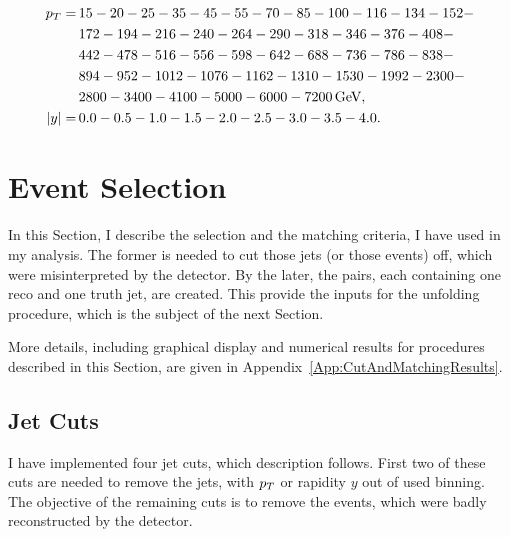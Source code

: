 \begin{align}
  p_{T} = \, &15-20-25-35-45-55-70-85-100-116-134-152- \nonumber \\
        &172-194-216-240-264-290-318-346-376-408- \nonumber \\
        &442-478-516-556-598-642-688-736-786-838- \nonumber \\
        &894-952-1012-1076-1162-1310-1530-1992-2300- \nonumber \\
        &2800-3400-4100-5000-6000-7200 \,\text{GeV}, \nonumber \\
  |y| = \, &0.0-0.5-1.0-1.5-2.0-2.5-3.0-3.5-4.0.
  \label{eq:Binning}
\end{align}

\section{Event Selection}

In this Section, I describe the selection and the matching criteria, I have used
in my analysis. The former is needed to cut those jets (or those events) off,
which were misinterpreted by the detector. By the later, the pairs, each
containing one reco and one truth jet, are created. This provide
the inputs for the unfolding procedure, which is the subject of the next
Section.

More details, including graphical display and numerical results for procedures
described in this Section, are given in Appendix~\ref{App:CutAndMatchingResults}.

\subsection{Jet Cuts}
\label{SubSec:JetCuts}

I have implemented four jet cuts, which description follows. First two of these
cuts are needed to remove the jets, with $p_{T}$ or rapidity $y$ out of used binning.
The objective of the remaining cuts is to remove the events, which were badly
reconstructed by the detector.

